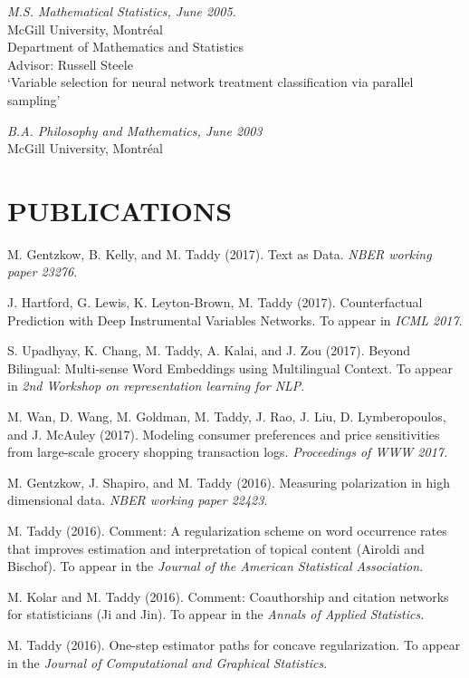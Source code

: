 \documentclass[margin,line]{res}
\begin{document}
\begin{resume}
\vspace{-0.2cm}
{\it M.S. Mathematical Statistics, June 2005.}\\
{\sc McGill University, Montr\'eal}\\
Department of Mathematics and Statistics\\
Advisor: Russell Steele\\
`Variable selection for neural network treatment classification via parallel sampling'

\vspace{-0.2cm}
{\it B.A. Philosophy and Mathematics, June 2003}\\
{\sc McGill University, Montr\'eal}

\medskip
\section{\bf PUBLICATIONS}


M. Gentzkow, B. Kelly, and M. Taddy (2017).  Text as Data. {\em NBER working paper 23276}.

J. Hartford, G. Lewis, K. Leyton-Brown, M. Taddy (2017).  Counterfactual Prediction with Deep Instrumental Variables Networks.  To appear in {\it ICML 2017}.

S. Upadhyay, K. Chang, M. Taddy, A. Kalai, and J. Zou (2017).  Beyond Bilingual: Multi-sense Word Embeddings using Multilingual
Context. To appear in {\it 2nd Workshop on representation learning for NLP}.

M. Wan, D. Wang, M. Goldman, M. Taddy, J. Rao, J. Liu, D. Lymberopoulos, and J. McAuley (2017).  Modeling consumer preferences and price sensitivities from large-scale grocery shopping transaction logs. {\it Proceedings of WWW 2017.}

M. Gentzkow, J. Shapiro, and M. Taddy (2016).  Measuring polarization in high dimensional data. {\em NBER working paper 22423}.

M. Taddy (2016). Comment: A regularization scheme on word occurrence rates that improves estimation and interpretation of topical content (Airoldi and Bischof). To appear in the {\it Journal of the American Statistical Association.} 

M. Kolar and M. Taddy (2016).  Comment: Coauthorship and citation networks for statisticians (Ji and Jin). To appear in the {\it Annals of Applied Statistics. }


M. Taddy (2016). One-step estimator paths for concave regularization.  To appear in the {\em Journal of Computational and Graphical Statistics}.


\end{resume}
\end{document}
